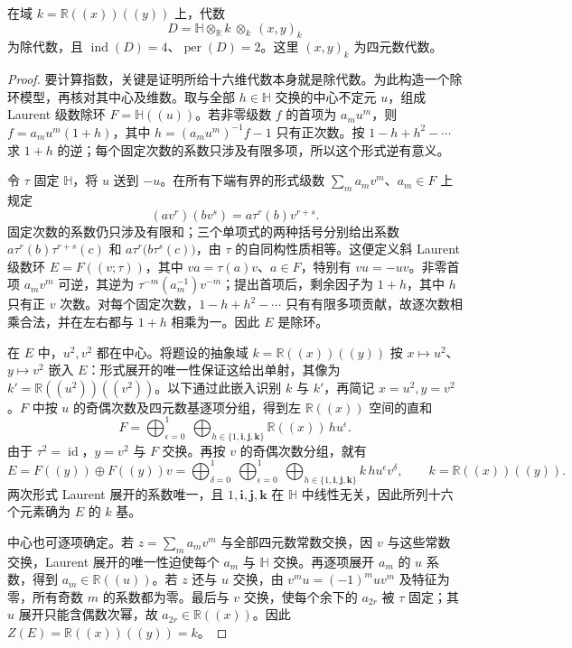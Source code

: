 \begin{example}\label{b2:exm:period-two-index-four}
	在域 \(k=\mathbb R(\!(x)\!)(\!(y)\!)\) 上，代数
	\[
		D=\mathbb H\otimes_{\mathbb R}k\ \otimes_k\ (x,y)_k
	\]
	为除代数，且 \(\operatorname{ind}(D)=4\)、\(\operatorname{per}(D)=2\)。这里 \((x,y)_k\) 为四元数代数。
\end{example}
\begin{proof}
	要计算指数，关键是证明所给十六维代数本身就是除代数。为此构造一个除环模型，再核对其中心及维数。取与全部 \(h\in\mathbb H\) 交换的中心不定元 \(u\)，组成 Laurent 级数除环 \(F=\mathbb H(\!(u)\!)\)。若非零级数 \(f\) 的首项为 \(a_mu^m\)，则 \(f=a_mu^m(1+h)\)，其中 \(h=(a_mu^m)^{-1}f-1\) 只有正次数。按 \(1-h+h^2-\cdots\) 求 \(1+h\) 的逆；每个固定次数的系数只涉及有限多项，所以这个形式逆有意义。

	令 \(\tau\) 固定 \(\mathbb H\)，将 \(u\) 送到 \(-u\)。在所有下端有界的形式级数 \(\sum_m a_m v^m\)、\(a_m\in F\) 上规定
	\[
		(a v^r)(b v^s)=a\tau^r(b)v^{r+s}.
	\]
	固定次数的系数仍只涉及有限和；三个单项式的两种括号分别给出系数 \(a\tau^r(b)\tau^{r+s}(c)\) 和 \(a\tau^r\bigl(b\tau^s(c)\bigr)\)，由 \(\tau\) 的自同构性质相等。这便定义斜 Laurent 级数环 \(E=F(\!(v;\tau)\!)\)，其中 \(va=\tau(a)v\)、\(a\in F\)，特别有 \(vu=-uv\)。非零首项 \(a_m v^m\) 可逆，其逆为 \(\tau^{-m}(a_m^{-1})v^{-m}\)；提出首项后，剩余因子为 \(1+h\)，其中 \(h\) 只有正 \(v\) 次数。对每个固定次数，\(1-h+h^2-\cdots\) 只有有限多项贡献，故逐次数相乘合法，并在左右都与 \(1+h\) 相乘为一。因此 \(E\) 是除环。

	在 \(E\) 中，\(u^2,v^2\) 都在中心。将题设的抽象域 \(k=\mathbb R(\!(x)\!)(\!(y)\!)\) 按 \(x\mapsto u^2\)、\(y\mapsto v^2\) 嵌入 \(E\)：形式展开的唯一性保证这给出单射，其像为 \(k'=\mathbb R(\!(u^2)\!)(\!(v^2)\!)\)。以下通过此嵌入识别 \(k\) 与 \(k'\)，再简记 \(x=u^2,y=v^2\)。\(F\) 中按 \(u\) 的奇偶次数及四元数基逐项分组，得到左 \(\mathbb R(\!(x)\!)\) 空间的直和
	\[
		F=\bigoplus_{\epsilon=0}^{1} \ \bigoplus_{h\in\{1,\mathbf i,\mathbf j,\mathbf k\}} \mathbb R(\!(x)\!)\,h u^\epsilon.
	\]
	由于 \(\tau^2=\operatorname{id}\)，\(y=v^2\) 与 \(F\) 交换。再按 \(v\) 的奇偶次数分组，就有
	\[
		E=F(\!(y)\!)\oplus F(\!(y)\!)v =\bigoplus_{\delta=0}^{1} \ \bigoplus_{\epsilon=0}^{1} \ \bigoplus_{h\in\{1,\mathbf i,\mathbf j,\mathbf k\}} k\,h u^\epsilon v^\delta, \qquad k=\mathbb R(\!(x)\!)(\!(y)\!).
	\]
	两次形式 Laurent 展开的系数唯一，且 \(1,\mathbf i,\mathbf j,\mathbf k\) 在 \(\mathbb H\) 中线性无关，因此所列十六个元素确为 \(E\) 的 \(k\) 基。

	中心也可逐项确定。若 \(z=\sum_m a_m v^m\) 与全部四元数常数交换，因 \(v\) 与这些常数交换，Laurent 展开的唯一性迫使每个 \(a_m\) 与 \(\mathbb H\) 交换。再逐项展开 \(a_m\) 的 \(u\) 系数，得到 \(a_m\in\mathbb R(\!(u)\!)\)。若 \(z\) 还与 \(u\) 交换，由 \(v^m u=(-1)^muv^m\) 及特征为零，所有奇数 \(m\) 的系数都为零。最后与 \(v\) 交换，使每个余下的 \(a_{2r}\) 被 \(\tau\) 固定；其 \(u\) 展开只能含偶数次幂，故 \(a_{2r}\in\mathbb R(\!(x)\!)\)。因此 \(Z(E)=\mathbb R(\!(x)\!)(\!(y)\!)=k\)。


\end{proof}
